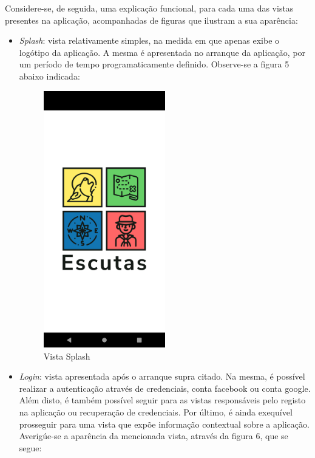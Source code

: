 \documentclass[12pt]{report}
\begin{document}
Considere-se, de seguida, uma explicação funcional, para cada uma das vistas presentes na aplicação, acompanhadas de figuras que ilustram a sua aparência:

\begin{itemize}
    \item \emph{Splash}: vista relativamente simples, na medida em que apenas exibe o logótipo da aplicação. A mesma é apresentada no arranque da aplicação, por um período de tempo programaticamente definido. Observe-se a figura 5 abaixo indicada:
    
    \bigskip
    \begin{figure}[H]
        \centering
        \includegraphics[width=0.5\textwidth]{view-splash.png}
        \caption{Vista Splash}
    \end{figure}
    
    \item \emph{Login}: vista apresentada após o arranque supra citado. Na mesma, é possível realizar a autenticação através de credenciais, conta \gls{facebook} ou conta \gls{google}. Além disto, é também possível seguir para as vistas responsáveis pelo registo na aplicação ou recuperação de credenciais. Por último, é ainda exequível prosseguir para uma vista que expõe informação contextual sobre a aplicação. Averigúe-se a aparência da mencionada vista, através da figura 6, que se segue:
    

\end{itemize}
\end{document}
